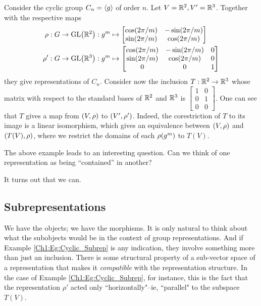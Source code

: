 \begin{boxexample} \label{Ch1:Eg:Cyclic_Subrep}
    Consider the cyclic group $C_n = \left\langle g \right\rangle$ of order $n$. Let $V = \mathbb{R}^2, V' = \mathbb{R}^3$. Together with the respective maps
    \begin{align*}
        \rho : G \to \GL{\R^2} &: g^m \mapsto \begin{bmatrix}
            \pcos{2\pi/m} & -\psin{2\pi/m} \\
            \psin{2\pi/m} & \pcos{2\pi/m}
        \end{bmatrix} \\
        \rho' : G \to \GL{\R^3} &: g^m \mapsto \begin{bmatrix}
            \pcos{2\pi/m} & -\psin{2\pi/m} & 0 \\
            \psin{2\pi/m} & \pcos{2\pi/m} & 0 \\
            0 & 0 & 1
        \end{bmatrix}
    \end{align*}
    they give representations of $C_n$. Consider now the inclusion $T : \mathbb{R}^2 \to \mathbb{R}^3$ whose matrix with respect to the standard bases of $\mathbb{R}^2$ and $\mathbb{R}^3$ is $\begin{bmatrix}
        1 & 0 \\ 0 & 1 \\ 0 & 0
    \end{bmatrix}$. One can see that $T$ gives a map from $\left( V, \rho \right)$ to $\left( V', \rho' \right)$. Indeed, the corestriction of $T$ to its image is a linear isomorphism, which gives an equivalence between $\left( V, \rho \right)$ and $\left( T(V), \rho \right)$, where we restrict the domains of each $\rho\!\left( g^m \right)$ to $T(V)$.
\end{boxexample}
The above example leads to an interesting question. Can we think of one representation as being ``contained'' in another?

It turns out that we can.

\subsection{Subrepresentations}

We have the objects; we have the morphisms. It is only natural to think about what the subobjects would be in the context of group representations. And if Example \ref{Ch1:Eg:Cyclic_Subrep} is any indication, they involve something more than just an inclusion. There is some structural property of a sub-vector space of a representation that makes it \textit{compatible} with the representation structure. In the case of Example \ref{Ch1:Eg:Cyclic_Subrep}, for instance, this is the fact that the representation $\rho'$ acted only ``horizontally"--ie, ``parallel" to the subspace $T(V)$.

